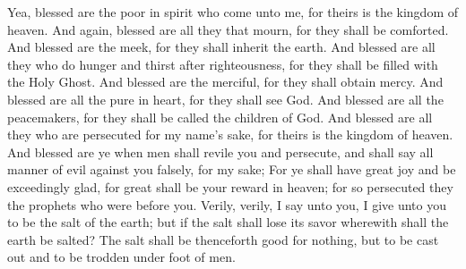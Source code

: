 Yea, blessed are the poor in spirit who come unto me, for theirs is the kingdom of heaven.
\bverse \iffalse And again, blessed are all they that mourn, for they shall be comforted. \fi
And again, blessed are all they that mourn, for they shall be comforted.
\bverse \iffalse And blessed are the meek, for they shall inherit the earth. \fi
And blessed are the meek, for they shall inherit the earth.
\bverse \iffalse And blessed are all they who do hunger and thirst after righteousness, for they shall be filled with the Holy Ghost. \fi
And blessed are all they who do hunger and thirst after righteousness, for they shall be filled with the Holy Ghost.
\bverse \iffalse And blessed are the merciful, for they shall obtain mercy. \fi
And blessed are the merciful, for they shall obtain mercy.
\bverse \iffalse And blessed are all the pure in heart, for they shall see God. \fi
And blessed are all the pure in heart, for they shall see God.
\bverse \iffalse And blessed are all the peacemakers, for they shall be called the children of God. \fi
And blessed are all the peacemakers, for they shall be called the children of God.
\bverse \iffalse And blessed are all they who are persecuted for my name's sake, for theirs is the kingdom of heaven. \fi
And blessed are all they who are persecuted for my name's sake, for theirs is the kingdom of heaven.
\bverse \iffalse And blessed are ye when men shall revile you and persecute, and shall say all manner of evil against you falsely, for my sake; \fi
And blessed are ye when men shall revile you and persecute, and shall say all manner of evil against you falsely, for my sake;
\bverse \iffalse For ye shall have great joy and be exceedingly glad, for great shall be your reward in heaven; for so persecuted they the prophets who were before you. \fi
For ye shall have great joy and be exceedingly glad, for great shall be your reward in heaven; for so persecuted they the prophets who were before you.
\bverse \iffalse Verily, verily, I say unto you, I give unto you to be the salt of the earth; but if the salt shall lose its savor wherewith shall the earth be salted? The salt shall be thenceforth good for nothing, but to be cast out and to be trodden under foot of men. \fi
Verily, verily, I say unto you, I give unto you to be the salt of the earth; but if the salt shall lose its savor wherewith shall the earth be salted? The salt shall be thenceforth good for nothing, but to be cast out and to be trodden under foot of men.
